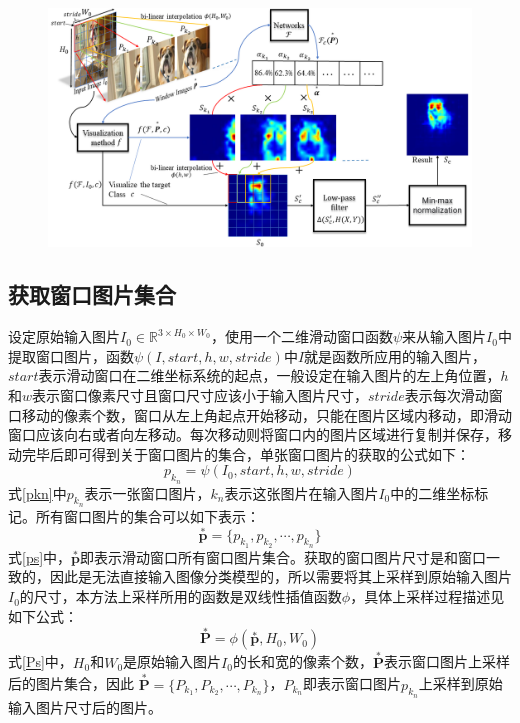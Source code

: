 \begin{figure}[!ht]
	\centering 
	\includegraphics[width=15cm]{fig/ch4/pipeline.png}
	\label{fig:pipeline}
\end{figure}

\subsection{获取窗口图片集合}
设定原始输入图片$I_0 \in \mathbb{R}^{3\times H_0 \times W_0}$，使用一个二维滑动窗口函数$\psi$来从输入图片$I_0$中提取窗口图片，函数$\psi(I, start, h, w, stride)$中$I$就是函数所应用的输入图片，$start$表示滑动窗口在二维坐标系统的起点，一般设定在输入图片的左上角位置，$h$和$w$表示窗口像素尺寸且窗口尺寸应该小于输入图片尺寸，$stride$表示每次滑动窗口移动的像素个数，窗口从左上角起点开始移动，只能在图片区域内移动，即滑动窗口应该向右或者向左移动。每次移动则将窗口内的图片区域进行复制并保存，移动完毕后即可得到关于窗口图片的集合，单张窗口图片的获取的公式如下：
\begin{equation}
	p_{k_n}=\psi(I_0,start,h,w,stride)
	\label{pkn}
\end{equation}
式\ref{pkn}中$p_{k_n}$表示一张窗口图片，$k_n$表示这张图片在输入图片$I_0$中的二维坐标标记。所有窗口图片的集合可以如下表示：
\begin{equation}
	\overset{*}{\bm{p}}=\{p_{k_1},p_{k_2},\cdots,p_{k_n}\}
\label{ps}
\end{equation}
式\ref{ps}中，$\overset{*}{\bm{p}}$即表示滑动窗口所有窗口图片集合。获取的窗口图片尺寸是和窗口一致的，因此是无法直接输入图像分类模型的，所以需要将其上采样到原始输入图片$I_0$的尺寸，本方法上采样所用的函数是双线性插值函数$\phi$，具体上采样过程描述见如下公式：
\begin{equation}
	\overset{*}{\bm{P}}=\phi(\overset{*}{\bm{p}},H_0,W_0) 
\label{Ps}
\end{equation}
式\ref{Ps}中，$H_0$和$W_0$是原始输入图片$I_0$的长和宽的像素个数，$\overset{*}{\bm{P}}$表示窗口图片上采样后的图片集合，因此 $\overset{*}{\bm{P}}=\{P_{k_1},P_{k_2},\cdots,P_{k_n}\}$，$P_{k_n}$即表示窗口图片$p_{k_n}$上采样到原始输入图片尺寸后的图片。

